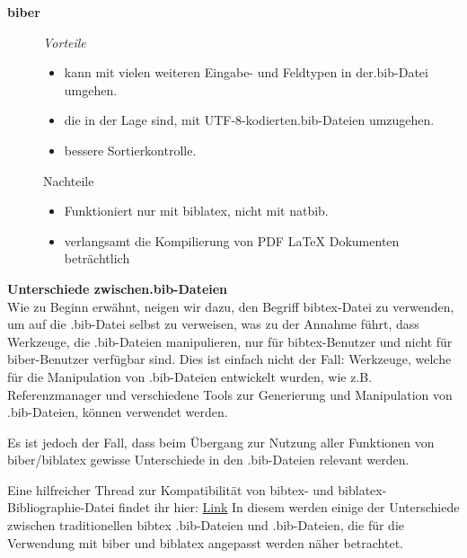 \textbf{biber}

\begin{description}
	\item[] \emph{Vorteile}
	\begin{itemize}
		\item kann mit vielen weiteren Eingabe- und Feldtypen in der.bib-Datei umgehen.
		\item die in der Lage sind, mit UTF-8-kodierten.bib-Dateien umzugehen.
		\item bessere Sortierkontrolle.
	\end{itemize}
	\item[] Nachteile
	\begin{itemize}
		\item Funktioniert nur mit biblatex, nicht mit natbib.
		\item verlangsamt die Kompilierung von PDF \LaTeX{} Dokumenten beträchtlich
	\end{itemize}
\end{description}

\textbf{Unterschiede zwischen.bib-Dateien}\\
Wie zu Beginn erwähnt, neigen wir dazu, den Begriff bibtex-Datei zu verwenden, um auf die .bib-Datei selbst zu verweisen, was zu der Annahme führt, dass Werkzeuge, die .bib-Dateien manipulieren, nur für bibtex-Benutzer und nicht für biber-Benutzer verfügbar sind. Dies ist einfach nicht der Fall: Werkzeuge, welche für die Manipulation von .bib-Dateien entwickelt wurden, wie z.B. Referenzmanager und verschiedene Tools zur Generierung und Manipulation von .bib-Dateien, können verwendet werden.

Es ist jedoch der Fall, dass beim Übergang zur Nutzung aller Funktionen von biber/biblatex gewisse Unterschiede in den .bib-Dateien relevant werden.

Eine hilfreicher Thread zur Kompatibilität von bibtex- und biblatex-Bibliographie-Datei findet ihr hier: \href{https://tex.stackexchange.com/questions/37095/compatibility-of-bibtex-and-biblatex-bibliography-files}{Link} In diesem werden einige der Unterschiede zwischen traditionellen bibtex .bib-Dateien und .bib-Dateien, die für die Verwendung mit biber und biblatex angepasst werden näher betrachtet.